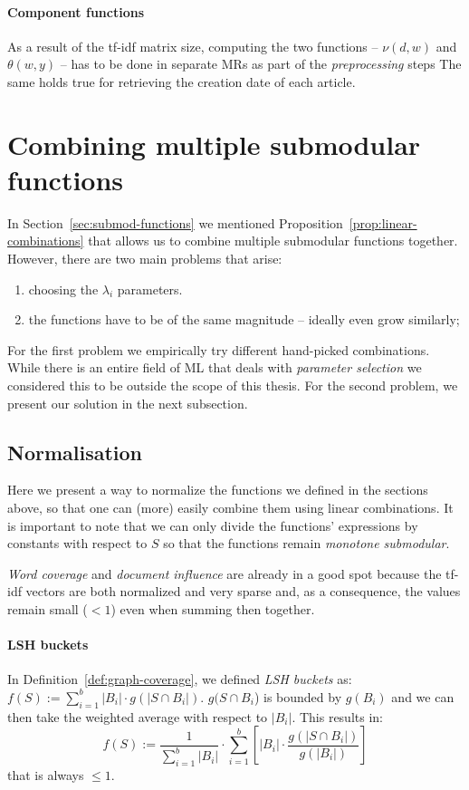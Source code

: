 \paragraph{Component functions}
As a result of the tf-idf matrix size, computing the two functions -- \(\nu(d,
w)\) and \(\theta(w, y)\) -- has to be done in separate \aclp{MR} as part of
the \emph{preprocessing} steps The same holds true for retrieving the creation
date of each article.

\section{Combining multiple submodular functions}

In Section~\vref{sec:submod-functions} we mentioned
Proposition~\ref{prop:linear-combinations} that allows us to combine multiple
submodular functions together.
However, there are two main problems that arise:
\begin{enumerate}
  \item choosing the \(\lambda_i\) parameters.
  \item the functions have to be of the same magnitude -- ideally even grow
  similarly;
\end{enumerate}

For the first problem we empirically try different hand-picked combinations.
While there is an entire field of \ac{ML} that deals with \emph{parameter
selection} we considered this to be outside the scope of this thesis.
For the second problem, we present our solution in the next subsection.

\subsection{Normalisation}

Here we present a way to normalize the functions we defined in the sections
above, so that one can (more) easily combine them using linear combinations.
It is important to note that we can only divide the functions' expressions by
constants with respect to \(S\) so that the functions remain \emph{monotone
submodular}.

\emph{Word coverage} and \emph{document influence} are already in a good spot
because the tf-idf vectors are both normalized and very sparse and, as a
consequence, the values remain small (\(< 1\)) even when summing then together.

\paragraph{LSH buckets}
In Definition~\vref{def:graph-coverage}, we defined \emph{LSH buckets} as: \(f(S) := \sum_{i=1}^b |B_i| \cdot g(|S \cap
B_i|)\).  \(g(S \cap B_i\)) is bounded by \(g(B_i)\) and we can then take the
weighted average with respect to \(|B_i|\). This results in:
\[
  f(S) :=
    \frac{1}{\sum_{i=1}^b |B_i|} \cdot
    \sum_{i=1}^b \left[ |B_i| \cdot \frac{g(|S \cap B_i|)}{g(|B_i|)} \right]
\]
that is always \(\leq 1\).


